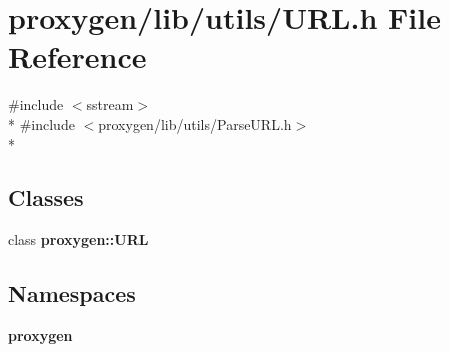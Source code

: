 \section{proxygen/lib/utils/\+U\+RL.h File Reference}
\label{URL_8h}
{\ttfamily \#include $<$sstream$>$}\\*
{\ttfamily \#include $<$proxygen/lib/utils/\+Parse\+U\+R\+L.\+h$>$}\\*
\subsection*{Classes}
\begin{DoxyCompactItemize}
\item 
class {\bf proxygen\+::\+U\+RL}
\end{DoxyCompactItemize}
\subsection*{Namespaces}
\begin{DoxyCompactItemize}
\item 
 {\bf proxygen}
\end{DoxyCompactItemize}
